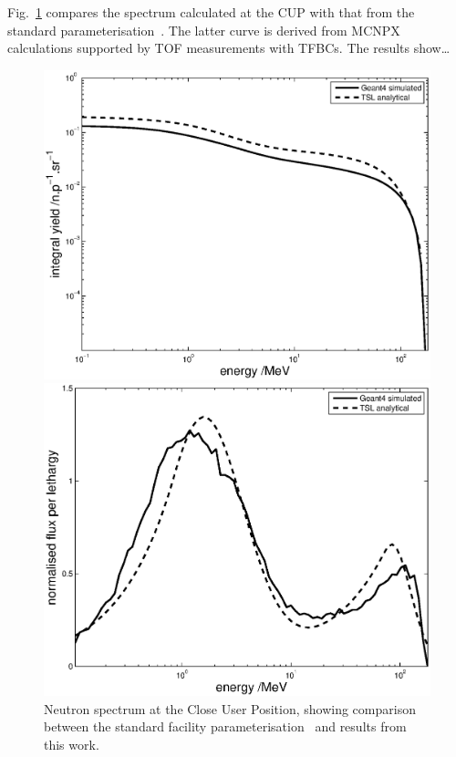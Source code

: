 \documentclass[11pt,a4paper]{IEEEtran}
\let\MYoriglatexcaption\caption
\renewcommand{\caption}[2][\relax]{\MYoriglatexcaption[#2]{#2}}
\begin{document}
Fig.~\ref{fig:CUPSpectraComparison} compares the spectrum calculated at the CUP with that from the standard parameterisation~\cite{Prokofiev14}.
The latter curve is derived from MCNPX calculations supported by TOF measurements with TFBCs.
The results show\ldots
{}

\begin{figure}[t]
    \begin{minipage}{\columnwidth}
        \centering
        \includegraphics[width=0.9\columnwidth]{ANITAIntYieldRADECS.eps}
    \end{minipage}
    \begin{minipage}{\columnwidth}
        \centering
        \includegraphics[width=0.9\columnwidth]{ANITALetYieldnormalisedRADECS.eps}
    \end{minipage}
	\caption{
        Neutron spectrum at the Close User Position, showing comparison between the standard facility parameterisation~\cite{Prokofiev2009} and results from this work.
    }
	\label{fig:CUPSpectraComparison}
\end{figure}
\end{document}
